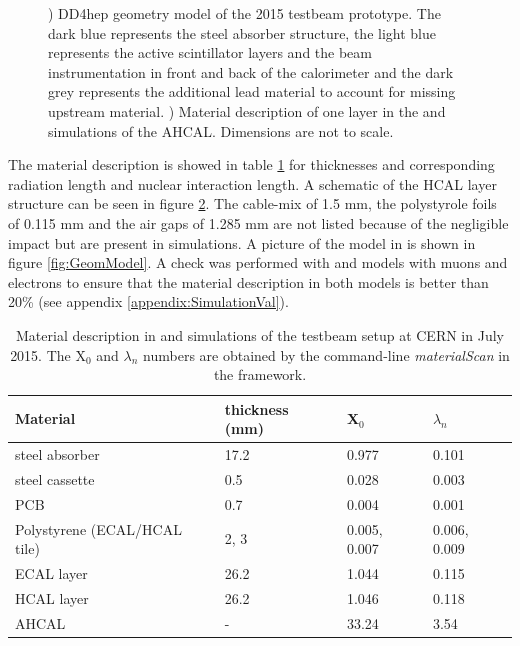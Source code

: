 \begin{figure}[htbp!]
\begin{subfigure}[t]{0.39\textwidth}
    \caption{} \label{fig:material_layout}
  \end{subfigure}
  \caption{) DD4hep geometry model of the 2015 testbeam prototype. The dark blue represents the steel absorber structure, the light blue represents the active scintillator layers and the beam instrumentation in front and back of the calorimeter and the dark grey represents the additional lead material to account for missing upstream material. ) Material description of one layer in the \mokka and \ddhep simulations of the AHCAL. Dimensions are not to scale.}
\end{figure}

The material description is showed in table \ref{table:material_sim} for thicknesses and corresponding radiation length and nuclear interaction length. A schematic of the HCAL layer structure can be seen in figure \ref{fig:material_layout}. The cable-mix of 1.5 mm, the polystyrole foils of 0.115 mm and the air gaps of 1.285 mm are not listed because of the negligible impact but are present in simulations. A picture of the model in \ddhep is shown in figure \ref{fig:GeomModel}. A check was performed with \mokka and \ddhep models with muons and electrons to ensure that the material description in both models is better than 20\% (see appendix \ref{appendix:SimulationVal}).
\begin{table}[htb!]
  \centering
  \caption{Material description in \mokka and \ddhep simulations of the testbeam setup at CERN in July 2015. The X$_0$ and $\lambda_n$ numbers are obtained by the command-line \textit{materialScan} in the \ddhep framework.}
  \label{table:material_sim}
  \begin{tabular}{@{} p{6cm}|l||l|l @{}}
    \hline
    Material & thickness (mm) & X$_0$ & $\lambda_n$ \\
    \hline
    \hline
    steel absorber & 17.2 & 0.977 & 0.101\\
    \hline
    steel cassette & 0.5 & 0.028 & 0.003\\
    \hline
    PCB & 0.7 & 0.004 & 0.001\\
    \hline
    Polystyrene (ECAL/HCAL tile) & 2, 3 & 0.005, 0.007 & 0.006, 0.009\\
    \hline
    \hline
    ECAL layer & 26.2 & 1.044 & 0.115\\
    HCAL layer & 26.2 & 1.046 & 0.118\\
    \hline
    AHCAL & - & 33.24 & 3.54\\
    \hline
  \end{tabular}
\end{table}

